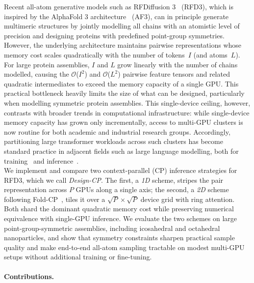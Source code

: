 \documentclass{article}
\theoremstyle{plain}
\theoremstyle{definition}
\theoremstyle{remark}
\begin{document}
Recent all-atom generative models such as RFDiffusion 3~\cite{butcher_novo_2025} (RFD3), which is inspired by the AlphaFold 3 architecture~\cite{abramson_accurate_2024} (AF3), can in principle generate multimeric structures by jointly modelling all chains with an atomistic level of precision and designing proteins with predefined point-group symmetries. However, the underlying architecture maintains pairwise representations whose memory cost scales quadratically with the number of tokens~$I$ (and atoms~$L$). For large protein assemblies, $I$ and $L$ grow linearly with the number of chains modelled, causing the $\mathcal{O}$($I^{2}$) and $\mathcal{O}$($L^{2}$) pairwise feature tensors and related quadratic intermediates to exceed the memory capacity of a single GPU. This practical bottleneck heavily limits the size of what can be designed, particularly when modelling symmetric protein assemblies. This single-device ceiling, however, contrasts with broader trends in computational infrastructure: while single-device memory capacity has grown only incrementally, access to multi-GPU clusters is now routine for both academic and industrial research groups. Accordingly, partitioning large transformer workloads across such clusters has become standard practice in adjacent fields such as large language modelling, both for training~\cite{li_sequence_2022} and inference~\cite{pope_efficiently_2022}.\\

We implement and compare two context-parallel (CP) inference strategies for RFD3, which we call \emph{Design-CP}. The first, a \emph{1D} scheme, stripes the pair representation across $P$ GPUs along a single axis; the second, a \emph{2D} scheme following Fold-CP~\cite{lin_fold-cp_2026}, tiles it over a $\sqrt{P}\times\sqrt{P}$ device grid with ring attention. Both shard the dominant quadratic memory cost while preserving numerical equivalence with single-GPU inference. We evaluate the two schemes on large point-group-symmetric assemblies, including icosahedral and octahedral nanoparticles, and show that symmetry constraints sharpen practical sample quality and make end-to-end all-atom sampling tractable on modest multi-GPU setups without additional training or fine-tuning.

\paragraph{Contributions.} 
\end{document}
